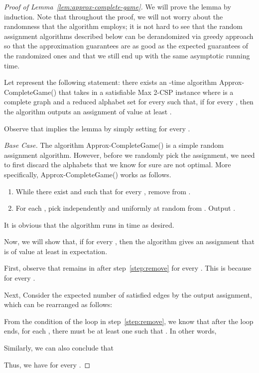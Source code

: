 \documentclass{article}
\begin{document}
\begin{proof}[Proof of Lemma~\ref{lem:approx-complete-game}]
We will prove the lemma by induction. Note that throughout the proof, we will not worry about the randomness that the algorithm employs; it is not hard to see that the random assignment algorithms described below can be derandomized via greedy approach so that the approximation guarantees are as good as the expected guarantees of the randomized ones and that we still end up with the same asymptotic running time.

Let  represent the following statement: there exists an -time algorithm {\sc Approx-CompleteGame}() that takes in a satisfiable {\sc Max 2-CSP} instance  where  is a complete graph and a reduced alphabet set  for every  such that, if  for every , then the algorithm outputs an assignment of value at least .

Observe that  implies the lemma by simply setting  for every .

{\em Base Case.} The algorithm {\sc Approx-CompleteGame}() is a simple random assignment algorithm. However, before we randomly pick the assignment, we need to first discard the alphabets that we know for sure are not optimal. More specifically, {\sc Approx-CompleteGame}() works as follows.
\begin{enumerate}
  \item While there exist  and  such that  for every , remove  from . \label{step:remove}
  \item For each , pick  independently and uniformly at random from . Output .
\end{enumerate}

It is obvious that the algorithm runs in  time as desired.

Now, we will show that, if  for every , then the algorithm gives an assignment that is of value at least  in expectation.

First, observe that  remains in  after step~\ref{step:remove} for every . This is because  for every .

Next, Consider the expected number of satisfied edges by the output assignment, which can be rearranged as follows:


From the condition of the loop in step~\ref{step:remove}, we know that after the loop ends, for each , there must be at least one  such that . In other words, 

Similarly, we can also conclude that 

Thus, we have  for every .


\end{proof}
\end{document}
